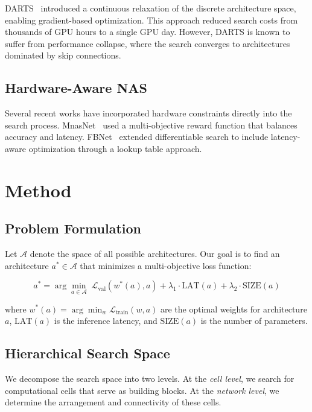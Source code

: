 \documentclass[12pt]{article}
\begin{document}
DARTS~\citep{liu2019darts} introduced a continuous relaxation of the discrete architecture space, enabling gradient-based optimization. This approach reduced search costs from thousands of GPU hours to a single GPU day. However, DARTS is known to suffer from performance collapse, where the search converges to architectures dominated by skip connections.

\subsection{Hardware-Aware NAS}

Several recent works have incorporated hardware constraints directly into the search process. MnasNet~\citep{tan2019mnasnet} used a multi-objective reward function that balances accuracy and latency. FBNet~\citep{wu2019fbnet} extended differentiable search to include latency-aware optimization through a lookup table approach.

\section{Method}

\subsection{Problem Formulation}

Let $\mathcal{A}$ denote the space of all possible architectures. Our goal is to find an architecture $a^* \in \mathcal{A}$ that minimizes a multi-objective loss function:

\begin{equation}
  a^* = \arg\min_{a \in \mathcal{A}} \; \mathcal{L}_{\text{val}}(w^*(a), a) + \lambda_1 \cdot \text{LAT}(a) + \lambda_2 \cdot \text{SIZE}(a)
\end{equation}

where $w^*(a) = \arg\min_w \mathcal{L}_{\text{train}}(w, a)$ are the optimal weights for architecture $a$, $\text{LAT}(a)$ is the inference latency, and $\text{SIZE}(a)$ is the number of parameters.

\subsection{Hierarchical Search Space}

We decompose the search space into two levels. At the \textit{cell level}, we search for computational cells that serve as building blocks. At the \textit{network level}, we determine the arrangement and connectivity of these cells.
\end{document}
